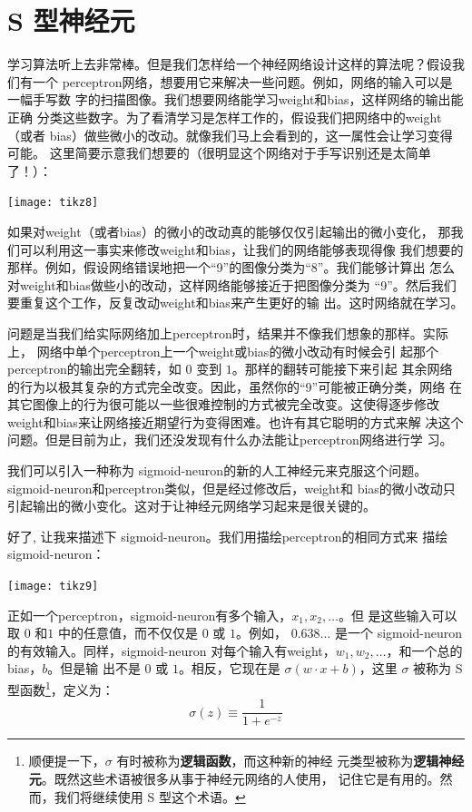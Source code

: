 \section{S 型神经元}
\label{seq:sigmoid_neurons}

学习算法听上去非常棒。但是我们怎样给一个神经网络设计这样的算法呢？假设我们有一个%
\gls*{perceptron}网络，想要用它来解决一些问题。例如，网络的输入可以是一幅手写数
字的扫描图像。我们想要网络能学习\gls*{weight}和\gls*{bias}，这样网络的输出能正确
分类这些数字。为了看清学习是怎样工作的，假设我们把网络中的\gls*{weight}（或者%
  \gls*{bias}）做些微小的改动。就像我们马上会看到的，这一属性会让学习变得可能。
这里简要示意我们想要的（很明显这个网络对于手写识别还是太简单了！）：
\begin{center}
  \texttt{[image: tikz8]}  
\end{center}

如果对\gls*{weight}（或者\gls*{bias}）的微小的改动真的能够仅仅引起输出的微小变化，
那我们可以利用这一事实来修改\gls*{weight}和\gls*{bias}，让我们的网络能够表现得像
我们想要的那样。例如，假设网络错误地把一个“9”的图像分类为“8”。我们能够计算出
怎么对\gls*{weight}和\gls*{bias}做些小的改动，这样网络能够接近于把图像分类为
“9”。然后我们要重复这个工作，反复改动\gls*{weight}和\gls*{bias}来产生更好的输
出。这时网络就在学习。

问题是当我们给实际网络加上\gls*{perceptron}时，结果并不像我们想象的那样。实际上，
网络中单个\gls*{perceptron}上一个\gls*{weight}或\gls*{bias}的微小改动有时候会引
起那个\gls*{perceptron}的输出完全翻转，如 $0$ 变到 $1$。那样的翻转可能接下来引起
其余网络的行为以极其复杂的方式完全改变。因此，虽然你的“9”可能被正确分类，网络
在其它图像上的行为很可能以一些很难控制的方式被完全改变。这使得逐步修改%
\gls*{weight}和\gls*{bias}来让网络接近期望行为变得困难。也许有其它聪明的方式来解
决这个问题。但是目前为止，我们还没发现有什么办法能让\gls*{perceptron}网络进行学
习。

我们可以引入一种称为 \gls*{sigmoid-neuron}的新的人工神经元来克服这个问题。
\gls*{sigmoid-neuron}和\gls*{perceptron}类似，但是经过修改后，\gls*{weight}和%
\gls*{bias}的微小改动只引起输出的微小变化。这对于让神经元网络学习起来是很关键的。

好了, 让我来描述下 \gls*{sigmoid-neuron}。我们用描绘\gls*{perceptron}的相同方式来
描绘 \gls*{sigmoid-neuron}：
\begin{center}
  \texttt{[image: tikz9]}
\end{center}

正如一个\gls*{perceptron}，\gls*{sigmoid-neuron}有多个输入，$x_1,x_2,\ldots$。但
是这些输入可以取 $0$ 和$1$ 中的任意值，而不仅仅是 $0$ 或 $1$。例如，
$0.638\ldots$ 是一个 \gls*{sigmoid-neuron}的有效输入。同样，\gls*{sigmoid-neuron}
对每个输入有\gls*{weight}，$w_1,w_2,\ldots$，和一个总的\gls*{bias}，$b$。但是输
出不是 $0$ 或 $1$。相反，它现在是 $\sigma(w \cdot x+b)$，这里 $\sigma$ 被称为 S
型函数\footnote{顺便提一下，$\sigma$ 有时被称为\textbf{逻辑函数}，而这种新的神经
  元类型被称为\textbf{逻辑神经元}。既然这些术语被很多从事于神经元网络的人使用，
  记住它是有用的。然而，我们将继续使用 S 型这个术语。}，定义为：
\begin{equation}
  \sigma(z) \equiv \frac{1}{1+e^{-z}}
  \label{eq:3}\tag{3}
\end{equation}

